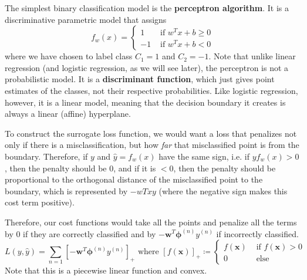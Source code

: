\documentclass{article}
\begin{document}
    \begin{definition}
      The simplest binary classification model is the \textbf{perceptron algorithm}. It is a discriminative parametric model that assigns 
      \begin{equation}
        f_w (x) = \begin{cases} 1 & \text{ if } w^T x + b \geq 0 \\ -1 & \text { if } w^T x + b < 0 \end{cases}
      \end{equation}
      where we have chosen to label class $C_1 = 1$ and $C_2 = -1$. Note that unlike linear regression (and logistic regression, as we will see later), the perceptron is not a probabilistic model. It is a \textbf{discriminant function}, which just gives point estimates of the classes, not their respective probabilities. Like logistic regression, however, it is a linear model, meaning that the decision boundary it creates is always a linear (affine) hyperplane. 
    \end{definition}

    To construct the surrogate loss function, we would want a loss that penalizes not only if there is a misclassification, but how \textit{far} that misclassified point is from the boundary. Therefore, if $y$ and $\hat{y} = f_w (x)$ have the same sign, i.e. if $y f_w (x) > 0$, then the penalty should be $0$, and if it is $< 0$, then the penalty should be proportional to the orthogonal distance of the misclassified point to the boundary, which is represented by $-wT x y$ (where the negative sign makes this cost term positive). 

    \begin{definition}
      Therefore, our cost functions would take all the points and penalize all the terms by $0$ if they are correctly classified and by $-\mathbf{w}^T \boldsymbol{\phi}^{(n)} y^{(n)}$ if incorrectly classified. 
      \begin{equation}
        L(y, \hat{y}) = \sum_{n=1} [ -\mathbf{w}^T \boldsymbol{\phi}^{(n)} y^{(n)} ]_+ \text{ where } [f(\mathbf{x})]_+ \coloneqq \begin{cases} f(\mathbf{x}) & \text{ if } f(\mathbf{x}) > 0 \\ 0 & \text{ else } \end{cases}
      \end{equation}
      Note that this is a piecewise linear function and convex. 
    \end{definition}
\end{document}
